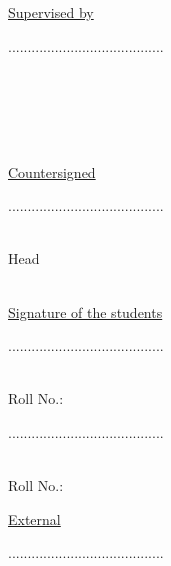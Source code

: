 \documentclass[../main.tex]{subfiles}
\begin{document}
\begin{multicols}{2}

\underline{Supervised by} 

\vspace{2\baselineskip} 
........................................

\supervisor \\
\supervisorDesignation \\
\dept \\
\ruet \\
\vspace{2\baselineskip} 

\underline{Countersigned}

\vspace{2\baselineskip} 
........................................

\deptHead \\
Head \\
\dept \\
\ruet

\columnbreak

\underline{Signature of the students}

\vspace{2\baselineskip} 
........................................

\authorA \\
Roll No.: \authorARoll 

\vspace{2\baselineskip} 
........................................


\authorB \\
Roll No.: \authorBRoll 

\vspace{2\baselineskip} 

\underline{External}

\vspace{2\baselineskip} 
........................................

\external \\
\externalDesignation \\
\externalDept \\
\externalUni 
\end{multicols}
\end{document}
